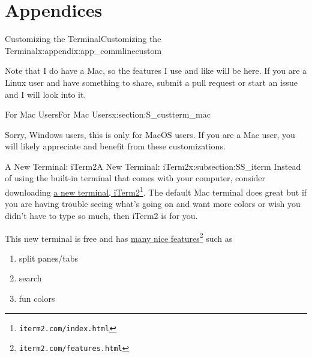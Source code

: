 \documentclass[oneside,10pt,]{book}
\begin{document}
\part*{Appendices}%
%
%
\typeout{************************************************}
\typeout{************************************************}
%
\begin{appendixptx}{Customizing the Terminal}{}{Customizing the Terminal}{}{}{x:appendix:app_commlinecustom}
%
\begin{introduction}{}%
Note that I do have a Mac, so the features I use and like will be here. If you are a Linux user and have something to share, submit a pull request or start an issue and I will look into it.%
\end{introduction}%
%
%
\typeout{************************************************}
\typeout{************************************************}
%
\begin{sectionptx}{For Mac Users}{}{For Mac Users}{}{}{x:section:S_custterm_mac}
%
\begin{introduction}{}%
Sorry, Windows users, this is only for MacOS users. If you are a Mac user, you will likely appreciate and benefit from these customizations.%
\end{introduction}%
%
%
\typeout{************************************************}
\typeout{************************************************}
%
\begin{subsectionptx}{A New Terminal: iTerm2}{}{A New Terminal: iTerm2}{}{}{x:subsection:SS_iterm}
%
Instead of using the built-in terminal that comes with your computer, consider downloading \href{https://iterm2.com/index.html}{a new terminal, iTerm2}\footnote{\nolinkurl{iterm2.com/index.html}\label{g:fn:idp616880440}}. The default Mac terminal does great but if you are having trouble seeing what's going on and want more colors or wish you didn't have to type so much, then iTerm2 is for you.%
\par
This new terminal is free and has \href{https://iterm2.com/features.html}{many nice features}\footnote{\nolinkurl{iterm2.com/features.html}\label{g:fn:idp616885432}} such as%
\begin{enumerate}
\item{}split panes\slash{}tabs%
\item{}search%
\item{}fun colors%

\end{enumerate}
\end{subsectionptx}
\end{sectionptx}
\end{appendixptx}
\end{document}
